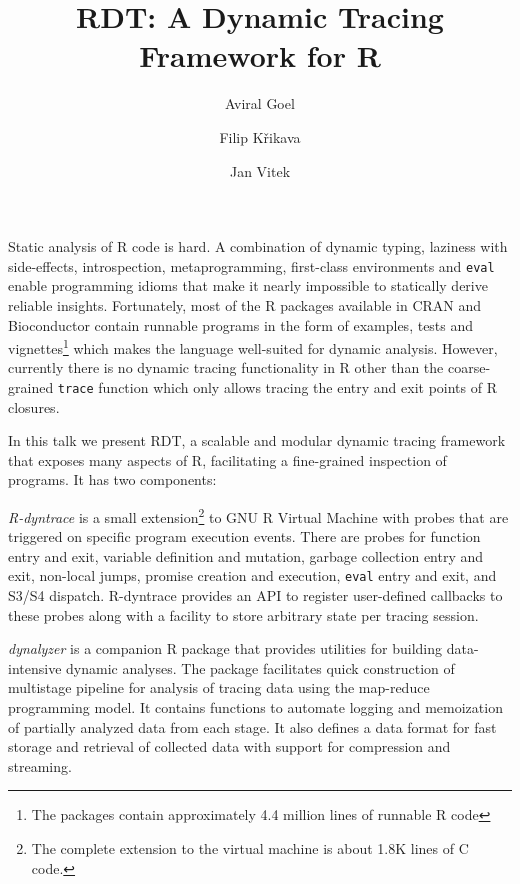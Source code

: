 \documentclass[acmsmall]{acmart}
\title{RDT: A Dynamic Tracing Framework for R}
\author{Aviral Goel}
\affiliation{
  \institution{Northeastern University}
  \country{USA}
}
\author{Filip Křikava}
\affiliation{
  \institution{Czech Technical University}
  \country{Czechia}
}
\author{Jan Vitek}
\affiliation{
  \institution{Northeastern University}
  \country{USA}
}
\affiliation{
  \institution{Czech Technical University}
  \country{Czechia}
}
\newcommand{\code}[1]{\lstinline|#1|\xspace}
\newcommand{\RDT}{RDT\xspace}
\newcommand{\RDyntrace}{R-dyntrace\xspace}
\newcommand{\dynalyzer}{dynalyzer\xspace}
\begin{document}
\maketitle

\vspace{-1mm}

Static analysis of R code is hard. A combination of dynamic typing, laziness
with side-effects, introspection, metaprogramming, first-class environments and
\code{eval} enable programming idioms that make it nearly impossible to
statically derive reliable insights. Fortunately, most of the R packages
available in CRAN and Bioconductor contain runnable programs in the form of
examples, tests and vignettes\footnote{The packages contain approximately 4.4
million lines of runnable R code} which makes the language well-suited for
dynamic analysis.
%
However, currently there is no dynamic tracing functionality in R other than the
coarse-grained \code{trace} function which only allows tracing the entry and exit
points of R closures.

In this talk we present \RDT, a scalable and modular dynamic tracing framework
that exposes many aspects of R, facilitating a fine-grained inspection of
programs. It has two components:
%
\begin{compactitem}[$-$]
\item \emph{\RDyntrace} is a small extension\footnote{The complete extension to
    the virtual machine is about 1.8K lines of C code.} to GNU R Virtual Machine
  with probes that are triggered on specific program execution events. There are
  probes for function entry and exit, variable definition and mutation, garbage
  collection entry and exit, non-local jumps, promise creation and execution,
  \code{eval} entry and exit, and S3/S4 dispatch. \RDyntrace provides an API to
  register user-defined callbacks to these probes along with a facility to store
  arbitrary state per tracing session.
\item \emph{\dynalyzer} is a companion R package that provides utilities for
  building data-intensive dynamic analyses. The package facilitates quick
  construction of multistage pipeline for analysis of tracing data using the
  map-reduce programming model. It contains functions to automate logging and
  memoization of partially analyzed data from each stage. It also defines a
  data format for fast storage and retrieval of collected data with support for
  compression and streaming.
\end{compactitem}
\end{document}
